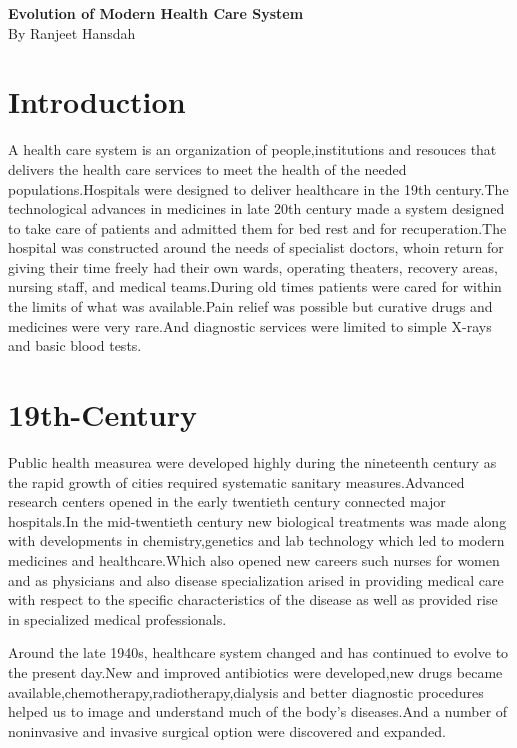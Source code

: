 \documentclass[12pt,A4paper]{article}
\begin{document}
\begin{center}
\huge\textbf{Evolution of Modern Health Care System}\\
\large{By Ranjeet Hansdah}\\
\end{center}
\section{Introduction}
A health care system is an organization of people,institutions and resouces that delivers the health care services to meet the health of the needed populations.Hospitals were designed to deliver healthcare in the 19th century.The technological advances in medicines in late 20th century made a system designed to take care of patients and admitted them for bed rest and for recuperation.The hospital was constructed around the needs of specialist doctors, whoin return for giving their time freely had their own wards, operating theaters, recovery areas, nursing staff, and medical teams.During old times patients were cared for within the limits of what was available.Pain relief was possible but curative drugs and medicines were very rare.And diagnostic services were limited to simple X-rays and basic blood tests.
\section{19th-Century}
Public health measurea were developed highly during the nineteenth century as the rapid growth of cities required systematic sanitary measures.Advanced research centers opened in the early twentieth century connected major hospitals.In the mid-twentieth century new biological treatments was made along with developments in chemistry,genetics and lab technology which led to modern medicines and healthcare.Which also opened new careers such nurses for women and as physicians and also disease specialization arised in providing medical care with respect to the specific characteristics of the disease as well as provided rise in specialized medical professionals.

Around the late 1940s, healthcare system changed and has continued to evolve to the present day.New and improved antibiotics were developed,new drugs became available,chemotherapy,radiotherapy,dialysis and better diagnostic procedures helped us to image and understand much of the body's diseases.And a number of noninvasive and invasive surgical option were discovered and expanded. 
 
\end{document}
